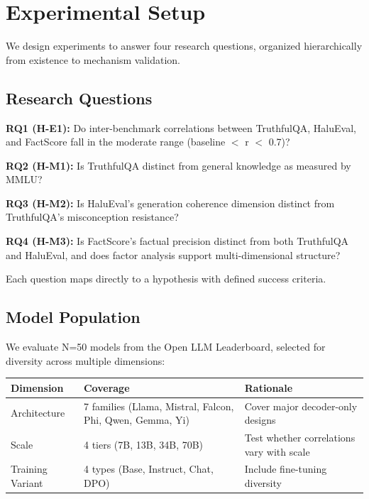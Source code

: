 \section{Experimental Setup}
\label{sec:experiments}

We design experiments to answer four research questions, organized hierarchically from existence to mechanism validation.

\subsection{Research Questions}

\textbf{RQ1 (H-E1):} Do inter-benchmark correlations between TruthfulQA, HaluEval, and FactScore fall in the moderate range (baseline $<$ r $<$ 0.7)?

\textbf{RQ2 (H-M1):} Is TruthfulQA distinct from general knowledge as measured by MMLU?

\textbf{RQ3 (H-M2):} Is HaluEval's generation coherence dimension distinct from TruthfulQA's misconception resistance?

\textbf{RQ4 (H-M3):} Is FactScore's factual precision distinct from both TruthfulQA and HaluEval, and does factor analysis support multi-dimensional structure?

Each question maps directly to a hypothesis with defined success criteria.

\subsection{Model Population}

We evaluate N=50 models from the Open LLM Leaderboard, selected for diversity across multiple dimensions:

\begin{table}[h]
\centering
\begin{tabular}{@{}lll@{}}
\toprule
\textbf{Dimension} & \textbf{Coverage} & \textbf{Rationale} \\
\midrule
Architecture & 7 families (Llama, Mistral, Falcon, Phi, Qwen, Gemma, Yi) & Cover major decoder-only designs \\
Scale & 4 tiers (7B, 13B, 34B, 70B) & Test whether correlations vary with scale \\
Training Variant & 4 types (Base, Instruct, Chat, DPO) & Include fine-tuning diversity \\
\bottomrule
\end{tabular}
\end{table}

